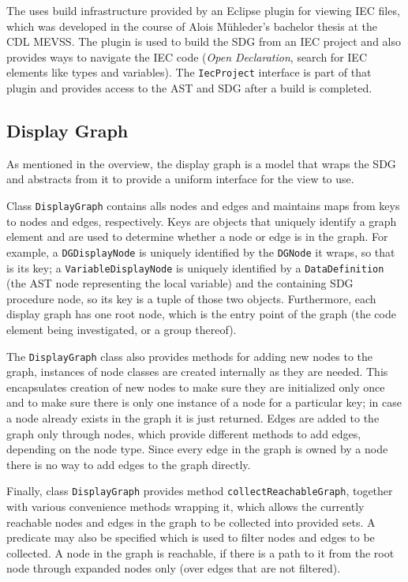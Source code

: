 The \SB uses build infrastructure provided by an Eclipse plugin for viewing IEC files, which was developed in the 
course of Alois Mühleder's bachelor thesis \cite{MuehlederBA} at the CDL MEVSS. The plugin is used to build the SDG 
from an IEC project and also provides ways to navigate the IEC code (\emph{Open Declaration}, search for IEC 
elements like types and variables). The \lstinline|IecProject| interface is part of that plugin and provides access to 
the AST and SDG after a build is completed.

\subsection{Display Graph}

As mentioned in the overview, the display graph is a model that wraps the SDG and abstracts from it to provide a 
uniform interface for the view to use.

Class \lstinline|DisplayGraph| contains alls nodes and edges and maintains maps from keys to nodes and edges, 
respectively. Keys are objects that uniquely identify a graph element and are used to determine whether a node or edge 
is in the graph. For example, a \lstinline|DGDisplayNode| is uniquely identified by the \lstinline|DGNode| it wraps, so 
that is its key; a \lstinline|VariableDisplayNode| is uniquely identified by a \lstinline|DataDefinition| (the AST node 
representing the local variable) and the containing SDG procedure node, so its key is a tuple of those two objects. 
Furthermore, each display graph has one root node, which is the entry point of the graph (the code element being 
investigated, or a group thereof).

The \lstinline|DisplayGraph| class also provides methods for adding new nodes to the graph, instances of node classes 
are created internally as they are needed. This encapsulates creation of new nodes to make sure they are initialized 
only once and to make sure there is only one instance of a node for a particular key; in case a node already exists in 
the graph it is just returned. Edges are added to the graph only through nodes, which provide different methods to add 
edges, depending on the node type. Since every edge in the graph is owned by a node there is no way to add edges to the 
graph directly.

Finally, class \lstinline|DisplayGraph| provides method \lstinline|collectReachableGraph|, together with various 
convenience methods wrapping it, which allows the currently reachable nodes and edges in the graph to be collected into 
provided sets. A predicate may also be specified which is used to filter nodes and edges to be collected. A node in the 
graph is reachable, if there is a path to it from the root node through expanded nodes only (over edges that are not 
filtered).

